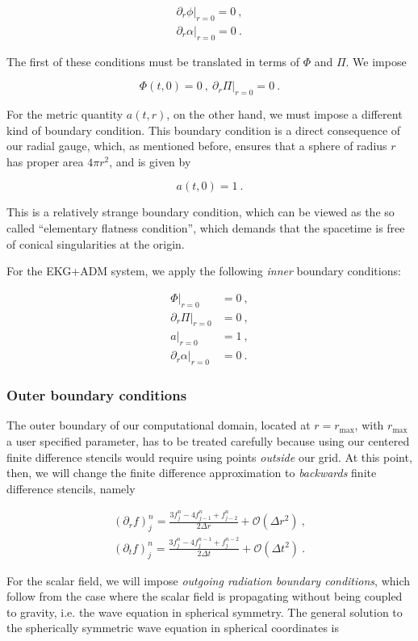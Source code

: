 \documentclass[a4paper,11pt]{article}
\renewcommand{\a}{\alpha}
\newcommand{\pd}{\partial}
\newcommand{\nn}{\nonumber}
\newcommand{\dt}{\Delta t}
\newcommand{\dr}{\Delta r}
\newcommand{\order}[2]{\mathcal{O}\lrpar{#1^{#2}}}
\newcommand{\lrpar}[1]{\left( #1 \right)}
\newcommand{\n}{\noindent}
\newcommand{\eq}[1]{
  \begin{equation}
    #1
  \end{equation}
}
\newcommand{\spl}[1]{
  \begin{split}
    #1
  \end{split}
}
\newcommand{\al}[1]{
  \begin{align}
    #1
  \end{align}
}
\renewcommand{\parbox}[2]{

  \vspace*{0.25in}
  
  \begin{tcolorbox}[title=Box #1,colback=blue!5!white,colframe=gray!75!black]
    #2
  \end{tcolorbox}

  \vspace*{0.25in}

}
\begin{document}
\al{
  \left.\pd_{r}\phi\right|_{r=0} = 0\ ,\\
  \left.\pd_{r}\a\right|_{r=0} = 0\ .
}

\n The first of these conditions must be translated in terms of $\Phi$ and $\Pi$. We impose

\eq{
  \Phi(t,0) = 0\ ,\ \left.\pd_{r}\Pi\right|_{r=0} = 0\ .
}

For the metric quantity $a(t,r)$, on the other hand, we must impose a different kind of boundary condition. This boundary condition is a direct consequence of our radial gauge, which, as mentioned before, ensures that a sphere of radius $r$ has proper area $4\pi r^{2}$, and is given by

\eq{ a(t,0) = 1\ . }

\n This is a relatively strange boundary condition, which can be viewed as the so called ``elementary flatness condition'', which demands that the spacetime is free of conical singularities at the origin.

\parbox{4: EKG+ADM -- Inner boundary conditions}{
  For the EKG+ADM system, we apply the following \emph{inner} boundary conditions:
  \al{
    \left.\Phi\right|_{r=0} &= 0\ ,\nn\\
    \left.\pd_{r}\Pi\right|_{r=0} &= 0\ ,\nn\\
    \left.a\right|_{r=0} &= 1\ ,\nn\\
    \left.\pd_{r}\a\right|_{r=0} &= 0\ .\nn
  }
}

\subsubsection{Outer boundary conditions}

The outer boundary of our computational domain, located at $r=r_{\max}$, with $r_{\max}$ a user specified parameter, has to be treated carefully because using our centered finite difference stencils would require using points \emph{outside} our grid. At this point, then, we will change the finite difference approximation to \emph{backwards} finite difference stencils, namely

\eq{
  \spl{
    \lrpar{\partial_{r}f}^{n}_{j} = \frac{3f^{n}_{j} - 4f^{n}_{j-1} + f^{n}_{j-2}}{2\dr} + \order{\dr}{2}\ ,\\
    \lrpar{\partial_{t}f}^{n}_{j} = \frac{3f^{n}_{j} - 4f^{n-1}_{j} + f^{n-2}_{j}}{2\dt} + \order{\dt}{2}\ .
  }
}

For the scalar field, we will impose \emph{outgoing radiation boundary conditions}, which follow from the case where the scalar field is propagating without being coupled to gravity, i.e. the wave equation in spherical symmetry. The general solution to the spherically symmetric wave equation in spherical coordinates is
\end{document}
